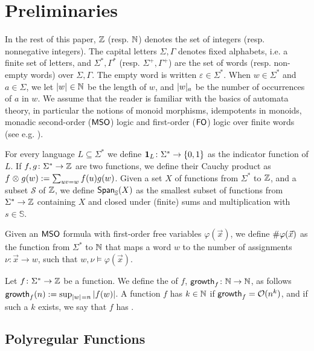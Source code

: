 \section{Preliminaries}
\label{preliminaries:sec}

\AP
In the rest of this paper, $\mathbb{Z}$ (resp. $\mathbb{N}$) denotes the set of integers
(resp. nonnegative integers). The capital letters $\Sigma,\Gamma$ denotes fixed
alphabets, i.e. a finite set of letters, and $\Sigma^*, \Gamma^*$ (resp.
$\Sigma^+, \Gamma^+$) are the set of words (resp. non-empty words) over
$\Sigma, \Gamma$. The empty word is written $\varepsilon \in \Sigma^*$. When $w
\in \Sigma^*$ and $a \in \Sigma$, we let $\card{w} \in \Nat$ be the length of
$w$, and $\card[a]{w}$ be the number of occurrences of $a$ in $w$. We assume
that the reader is familiar with the basics of automata theory, in particular
the notions of monoid morphisms, idempotents in monoids, monadic second-order
($\mathsf{MSO}$) logic and first-order ($\mathsf{FO}$) logic over finite words (see e.g.
\cite{thomas1997languages}). 

\AP
For every language $L \subseteq \Sigma^*$ we define $\mathbf{1}_{L} \colon \Sigma^*
\to \mathopen{\{} 0,1 \mathclose{\}}$ as the indicator function of $L$. If $f,g \colon \Sigma^* \to
\mathbb{Z}$ are two functions, we define their Cauchy product as $f \mathrel{\otimes} g (w)
\mathrel{:=} \sum_{uv = w} f(u)g(w)$. Given a set $X$ of functions from $\Sigma^*$
to $\mathbb{Z}$, and a subset $\mathcal{S}$ of $\mathbb{Z}$, we define
$\mathop{\mathsf{Span}_{\mathbb{S}}}(X)$ as the smallest subset of functions from $\Sigma^* \to
\mathbb{Z}$ containing $X$ and closed under (finite) sums and multiplication with $s
\in \mathbb{S}$.

\AP
Given an $\mathsf{MSO}$ formula with first-order free variables $\varphi(\vec{x})$, we
define ${{\#}\varphi(\vec{x})}$ as the function from $\Sigma^*$ to $\mathbb{N}$
that maps a word $w$ to the number of assignments $\nu \colon \vec{x} \to w$,
such that $w, \nu \models \varphi(\vec{x})$.

\AP Let $f \colon \Sigma^* \to \mathbb{Z}$ be a function. We define
the  of
$f$, $\mathsf{growth}_{f} \colon \mathbb{N} \to \mathbb{N}$, as follows $\growth{f}(n) \defined
\sup_{\card{w} = n} |f(w)|$. A function $f$ has  $k \in \mathbb{N}$
if $\mathsf{growth}_{f} = \mathcal{O}(n^k)$, and if such a $k$ exists,
we say that $f$ has .

\subsection{Polyregular Functions}

